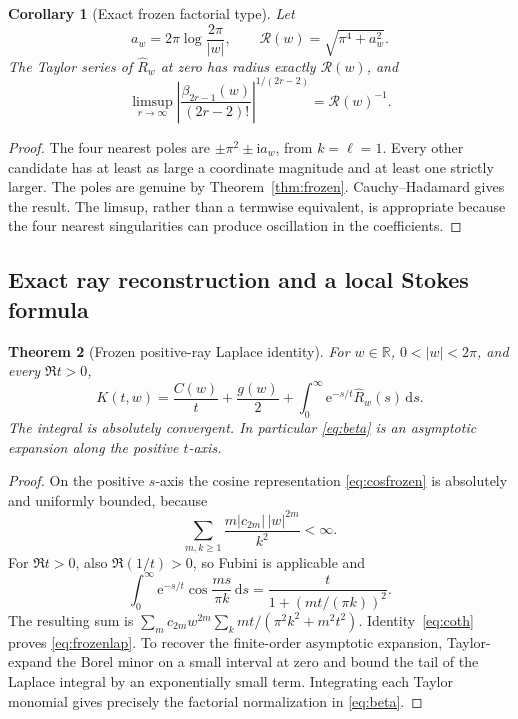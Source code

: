 \documentclass[11pt,a4paper]{article}
\numberwithin{equation}{section}
\newtheorem{theorem}{Theorem}[section]
\newtheorem{corollary}[theorem]{Corollary}
\theoremstyle{definition}
\theoremstyle{remark}
\newcommand{\R}{\mathbb R}
\newcommand{\ii}{\mathrm i}
\newcommand{\e}{\mathrm e}
\newcommand{\dd}{\,\mathrm d}
\begin{document}
\begin{corollary}[Exact frozen factorial type]
\label{cor:frozentype}
Let
\begin{equation}
 a_w=2\pi\log\frac{2\pi}{|w|},\qquad
 \mathcal R(w)=\sqrt{\pi^4+a_w^2}.
 \label{eq:radius}
\end{equation}
The Taylor series of $\widehat R_w$ at zero has radius exactly $\mathcal R(w)$, and
\begin{equation}
 \limsup_{r\to\infty}
 \left|\frac{\beta_{2r-1}(w)}{(2r-2)!}\right|^{1/(2r-2)}
 =\mathcal R(w)^{-1}.
 \label{eq:frozentype}
\end{equation}
\end{corollary}
\begin{proof}
The four nearest poles are $\pm\pi^2\pm\ii a_w$, from $k=\ell=1$. Every other candidate has at least as large a coordinate magnitude and at least one strictly larger. The poles are genuine by Theorem~\ref{thm:frozen}. Cauchy--Hadamard gives the result. The limsup, rather than a termwise equivalent, is appropriate because the four nearest singularities can produce oscillation in the coefficients.
\end{proof}

\subsection{Exact ray reconstruction and a local Stokes formula}
\begin{theorem}[Frozen positive-ray Laplace identity]
\label{thm:frozenlap}
For $w\in\R$, $0<|w|<2\pi$, and every $\Re t>0$,
\begin{equation}
 K(t,w)=\frac{C(w)}t+\frac{g(w)}2+
       \int_0^\infty\e^{-s/t}\widehat R_w(s)\dd s.
 \label{eq:frozenlap}
\end{equation}
The integral is absolutely convergent. In particular \eqref{eq:beta} is an asymptotic expansion along the positive $t$-axis.
\end{theorem}
\begin{proof}
On the positive $s$-axis the cosine representation \eqref{eq:cosfrozen} is absolutely and uniformly bounded, because
\[
 \sum_{m,k\ge1}\frac{m|c_{2m}|\,|w|^{2m}}{k^2}<\infty.
\]
For $\Re t>0$, also $\Re(1/t)>0$, so Fubini is applicable and
\[
 \int_0^\infty\e^{-s/t}\cos\frac{ms}{\pi k}\dd s
 =\frac{t}{1+(mt/(\pi k))^2}.
\]
The resulting sum is
$\sum_m c_{2m}w^{2m}\sum_k mt/(\pi^2k^2+m^2t^2)$.
Identity~\eqref{eq:coth} proves \eqref{eq:frozenlap}. To recover the finite-order asymptotic expansion, Taylor-expand the Borel minor on a small interval at zero and bound the tail of the Laplace integral by an exponentially small term. Integrating each Taylor monomial gives precisely the factorial normalization in \eqref{eq:beta}.
\end{proof}
\end{document}
